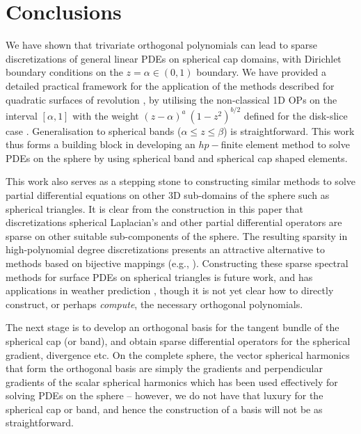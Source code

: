 %
\section{Conclusions}

We have shown that trivariate orthogonal polynomials can lead to sparse discretizations of general linear PDEs on spherical cap domains, with Dirichlet boundary conditions on the $z = \alpha \in (0,1)$ boundary. We have provided a detailed practical framework for the application of the methods described for quadratic surfaces of revolution \cite{olver2020orthogonal}, by utilising the non-classical 1D OPs on the interval $[\alpha, 1]$ with the weight $(z - \alpha)^a \: (1-z^2)^{b/2}$ defined for the disk-slice case \cite{snowball2019sparse}. Generalisation to spherical bands ($\alpha \leq z \leq \beta$) is straightforward.  This work thus forms a building block in developing an $hp-$finite element method to solve PDEs on the sphere by using spherical band and spherical cap shaped elements.

This work also serves as a stepping stone to constructing similar methods to solve partial differential equations on other 3D sub-domains of the sphere such as spherical triangles. It is clear from the construction in this paper that discretizations spherical Laplacian's  and other partial differential operators are sparse on other suitable sub-components of the sphere. The resulting sparsity in high-polynomial degree discretizations presents an attractive alternative to methods based on bijective mappings (e.g., \cite{DGShallowWater,FEMShallowWater,boyd2005sphere}). Constructing these sparse spectral methods for surface PDEs on spherical triangles is future work, and has applications in weather prediction \cite{staniforth2012horizontal}, though it is not yet clear how to directly construct, or perhaps \textit{compute}, the necessary orthogonal polynomials. 

The next stage is to develop an orthogonal basis for the tangent bundle of the spherical cap (or band), and obtain sparse differential operators for the spherical gradient, divergence etc. On the complete sphere, the vector spherical harmonics that form the orthogonal basis are simply the gradients and perpendicular gradients of the scalar spherical harmonics \cite{barrera1985vector} which has been used effectively for solving PDEs on the sphere \cite{vasil2019tensor,lecoanet2019tensor} -- however, we do not have that luxury for the spherical cap or band, and hence the construction of a basis will not be as straightforward.







  







